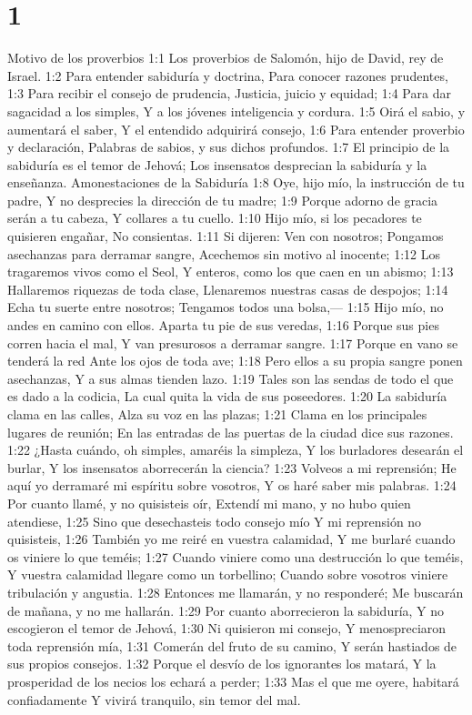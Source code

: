 
\chapter{1}

Motivo de los proverbios  
1:1 Los proverbios de Salomón, hijo de David, rey de Israel.  
1:2 Para entender sabiduría y doctrina,  
Para conocer razones prudentes,  
1:3 Para recibir el consejo de prudencia,  
Justicia, juicio y equidad;  
1:4 Para dar sagacidad a los simples,  
Y a los jóvenes inteligencia y cordura.  
1:5 Oirá el sabio, y aumentará el saber,  
Y el entendido adquirirá consejo,  
1:6 Para entender proverbio y declaración,  
Palabras de sabios, y sus dichos profundos.  
1:7 El principio de la sabiduría es el temor de Jehová; 
Los insensatos desprecian la sabiduría y la enseñanza.  
Amonestaciones de la Sabiduría  
1:8 Oye, hijo mío, la instrucción de tu padre,  
Y no desprecies la dirección de tu madre;  
1:9 Porque adorno de gracia serán a tu cabeza, 
Y collares a tu cuello.  
1:10 Hijo mío, si los pecadores te quisieren engañar, 
No consientas. 
1:11 Si dijeren: Ven con nosotros;  
Pongamos asechanzas para derramar sangre,  
Acechemos sin motivo al inocente;  
1:12 Los tragaremos vivos como el Seol,  
Y enteros, como los que caen en un abismo;  
1:13 Hallaremos riquezas de toda clase,  
Llenaremos nuestras casas de despojos;  
1:14 Echa tu suerte entre nosotros;  
Tengamos todos una bolsa,—  
1:15 Hijo mío, no andes en camino con ellos.  
Aparta tu pie de sus veredas,  
1:16 Porque sus pies corren hacia el mal,  
Y van presurosos a derramar sangre.  
1:17 Porque en vano se tenderá la red  
Ante los ojos de toda ave; 
1:18 Pero ellos a su propia sangre ponen asechanzas,  
Y a sus almas tienden lazo.  
1:19 Tales son las sendas de todo el que es dado a la codicia,  
La cual quita la vida de sus poseedores.  
1:20 La sabiduría clama en las calles,  
Alza su voz en las plazas;  
1:21 Clama en los principales lugares de reunión;  
En las entradas de las puertas de la ciudad dice sus razones. 
1:22 ¿Hasta cuándo, oh simples, amaréis la simpleza,  
Y los burladores desearán el burlar,  
Y los insensatos aborrecerán la ciencia?  
1:23 Volveos a mi reprensión;  
He aquí yo derramaré mi espíritu sobre vosotros,  
Y os haré saber mis palabras.  
1:24 Por cuanto llamé, y no quisisteis oír,  
Extendí mi mano, y no hubo quien atendiese,  
1:25 Sino que desechasteis todo consejo mío  
Y mi reprensión no quisisteis,  
1:26 También yo me reiré en vuestra calamidad,  
Y me burlaré cuando os viniere lo que teméis;  
1:27 Cuando viniere como una destrucción lo que teméis,  
Y vuestra calamidad llegare como un torbellino;  
Cuando sobre vosotros viniere tribulación y angustia.  
1:28 Entonces me llamarán, y no responderé;  
Me buscarán de mañana, y no me hallarán.  
1:29 Por cuanto aborrecieron la sabiduría,  
Y no escogieron el temor de Jehová,  
1:30 Ni quisieron mi consejo,  
Y menospreciaron toda reprensión mía,  
1:31 Comerán del fruto de su camino,  
Y serán hastiados de sus propios consejos.  
1:32 Porque el desvío de los ignorantes los matará,  
Y la prosperidad de los necios los echará a perder;  
1:33 Mas el que me oyere, habitará confiadamente  
Y vivirá tranquilo, sin temor del mal.  

